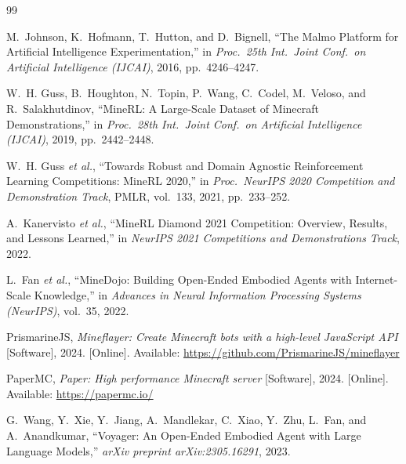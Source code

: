 \begin{thebibliography}{99}


M.~Johnson, K.~Hofmann, T.~Hutton, and D.~Bignell,
``The Malmo Platform for Artificial Intelligence Experimentation,''
in \emph{Proc.\ 25th Int.\ Joint Conf.\ on Artificial Intelligence (IJCAI)},
2016, pp.~4246--4247.

W.~H. Guss, B.~Houghton, N.~Topin, P.~Wang, C.~Codel, M.~Veloso, and
R.~Salakhutdinov,
``MineRL: A Large-Scale Dataset of Minecraft Demonstrations,''
in \emph{Proc.\ 28th Int.\ Joint Conf.\ on Artificial Intelligence (IJCAI)},
2019, pp.~2442--2448.

W.~H. Guss \emph{et al.},
``Towards Robust and Domain Agnostic Reinforcement Learning Competitions:
MineRL 2020,''
in \emph{Proc.\ NeurIPS 2020 Competition and Demonstration Track},
PMLR, vol.~133, 2021, pp.~233--252.

A.~Kanervisto \emph{et al.},
``MineRL Diamond 2021 Competition: Overview, Results, and Lessons Learned,''
in \emph{NeurIPS 2021 Competitions and Demonstrations Track},
2022.

L.~Fan \emph{et al.},
``MineDojo: Building Open-Ended Embodied Agents with Internet-Scale
Knowledge,''
in \emph{Advances in Neural Information Processing Systems (NeurIPS)},
vol.~35, 2022.

PrismarineJS,
\emph{Mineflayer: Create Minecraft bots with a high-level JavaScript API}
[Software], 2024. [Online]. Available:
\url{https://github.com/PrismarineJS/mineflayer}

PaperMC,
\emph{Paper: High performance Minecraft server} [Software], 2024.
[Online]. Available: \url{https://papermc.io/}


G.~Wang, Y.~Xie, Y.~Jiang, A.~Mandlekar, C.~Xiao, Y.~Zhu, L.~Fan, and
A.~Anandkumar,
``Voyager: An Open-Ended Embodied Agent with Large Language Models,''
\emph{arXiv preprint arXiv:2305.16291}, 2023.


\end{thebibliography}
